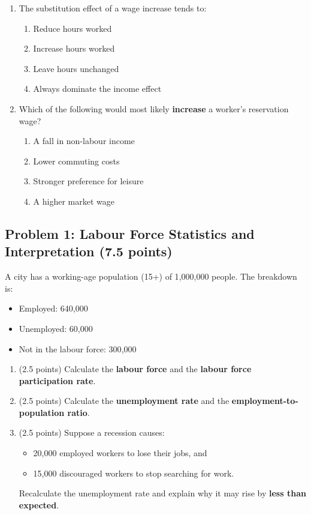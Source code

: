 \documentclass[11pt]{article}
\begin{document}
\begin{enumerate}
\item The substitution effect of a wage increase tends to:

\begin{enumerate}
\item Reduce hours worked  
\item Increase hours worked  
\item Leave hours unchanged  
\item Always dominate the income effect  
\end{enumerate}

\item Which of the following would most likely \textbf{increase} a worker's reservation wage?

\begin{enumerate}
\item A fall in non-labour income  
\item Lower commuting costs  
\item Stronger preference for leisure  
\item A higher market wage  
\end{enumerate}
\end{enumerate}



\subsection*{Problem 1: Labour Force Statistics and Interpretation (7.5 points)}

A city has a working-age population (15+) of 1{,}000{,}000 people. The breakdown is:

\begin{itemize}
\item Employed: 640{,}000  
\item Unemployed: 60{,}000  
\item Not in the labour force: 300{,}000  
\end{itemize}

\begin{enumerate}
\item[(a)] (2.5 points)  
Calculate the \textbf{labour force} and the \textbf{labour force participation rate}.

\item[(b)] (2.5 points)  
Calculate the \textbf{unemployment rate} and the \textbf{employment-to-population ratio}.

\item[(c)] (2.5 points)  
Suppose a recession causes:
\begin{itemize}
\item 20{,}000 employed workers to lose their jobs, and  
\item 15{,}000 discouraged workers to stop searching for work.
\end{itemize}

Recalculate the unemployment rate and explain why it may rise by \textbf{less than expected}.
\end{enumerate}
\end{document}
